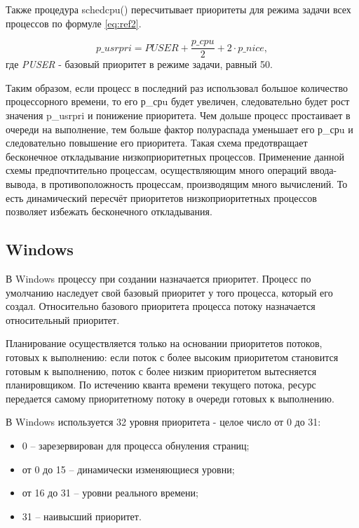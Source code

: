Также процедура schedcpu() пересчитывает приоритеты для режима задачи
всех процессов по формуле \ref{eq:ref2}.

\begin{equation}
	\label{eq:ref2}
	p\_usrpri = PUSER + \frac{p\_cpu}{2} + 2 \cdot p\_nice ,
\end{equation}где \textit{PUSER} - базовый приоритет в режиме задачи, равный 50.

Таким образом, если процесс в последний раз использовал большое количество процессорного времени, то его р\_срu будет увеличен, следовательно будет рост значения p\_usrpri и понижение приоритета.  Чем дольше процесс простаивает в очереди на выполнение, тем больше фактор полураспада уменьшает его р\_срu и следовательно повышение его приоритета. Такая схема предотвращает бесконечное откладывание низкоприоритетных процессов. Применение данной схемы предпочтительно процессам, осуществляющим много операций ввода-вывода, в противоположность процессам, производящим много вычислений. То есть динамический пересчёт приоритетов низкоприоритетных процессов позволяет избежать бесконечного откладывания.


\subsection{Windows}

В Windows процессу при создании назначается приоритет. Процесс по умолчанию наследует свой базовый приоритет у того процесса, который его создал. Относительно базового приоритета процесса потоку назначается относительный приоритет. 

Планирование осуществляется только на основании приоритетов потоков, готовых к выполнению: если поток с более высоким приоритетом становится готовым к выполнению, поток с более низким приоритетом вытесняется планировщиком. По истечению кванта времени текущего потока, ресурс передается самому приоритетному потоку в очереди готовых к выполнению.

В Windows используется 32 уровня приоритета - целое число от 0 до 31:
\begin{itemize}[label*=---]
	\item 0 -- зарезервирован для процесса обнуления страниц;
	\item от 0 до 15 -- динамически изменяющиеся уровни;
	\item от 16 до 31 -- уровни реального времени;
	\item 31 -- наивысший приоритет.
\end{itemize}

